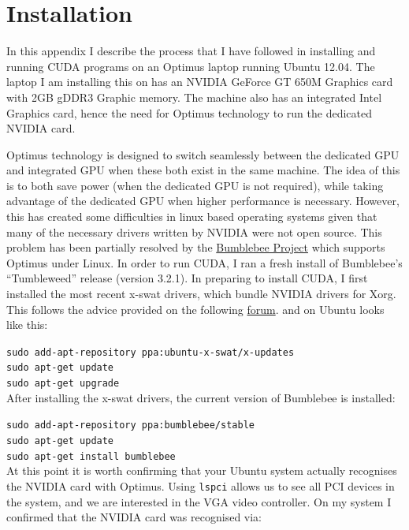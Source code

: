 \documentclass[a4paper,10pt]{article}
\begin{document}
\section{Installation}
In this appendix I describe the process that I have followed in installing and
running CUDA programs on an Optimus laptop running Ubuntu 12.04.  The laptop I 
am installing this on has an NVIDIA GeForce GT 650M Graphics card with 2GB 
gDDR3 Graphic memory.  The machine also has an integrated Intel Graphics card,
hence the need for Optimus technology to run the dedicated NVIDIA card.

Optimus technology is designed to switch seamlessly between the dedicated GPU
and integrated GPU when these both exist in the same machine.  The idea of this
is to both save power (when the dedicated GPU is not required), while taking
advantage of the dedicated GPU when higher performance is necessary.  However,
this has created some difficulties in linux based operating systems given that
many of the necessary drivers written by NVIDIA were not open source.  This
problem has been partially resolved by the 
\href{http://bumblebee-project.org/}{Bumblebee Project} which supports Optimus
under Linux.  In order to run CUDA, I ran a fresh install of Bumblebee's 
``Tumbleweed'' release (version 3.2.1).  In preparing to install CUDA, I first 
installed the most recent x-swat drivers, which bundle NVIDIA drivers for Xorg.
This follows the advice provided on the following 
\href{http://www.ivegotavirus.com/installing-bumblebee-3-0-tumbleweed-on-ubuntu/}{forum}.
and on Ubuntu looks like this:

\texttt{sudo add-apt-repository ppa:ubuntu-x-swat/x-updates} \\
\indent\texttt{sudo apt-get update} \\
\indent\texttt{sudo apt-get upgrade} \\

After installing the x-swat drivers, the current version of Bumblebee is 
installed:

\texttt{sudo add-apt-repository ppa:bumblebee/stable} \\
\indent\texttt{sudo apt-get update} \\
\indent\texttt{sudo apt-get install bumblebee} \\

At this point it is worth confirming that your Ubuntu system actually 
recognises the NVIDIA card with Optimus.  Using \texttt{lspci} allows us to see
all PCI devices in the system, and we are interested in the VGA video 
controller.  On my system I confirmed that the NVIDIA card was recognised via:
\end{document}
